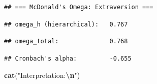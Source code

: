 \documentclass[
]{article}
\newenvironment{Shaded}{\begin{snugshade}}{\end{snugshade}}
\newcommand{\DecValTok}[1]{\textcolor[rgb]{0.00,0.00,0.81}{#1}}
\newcommand{\FunctionTok}[1]{\textcolor[rgb]{0.13,0.29,0.53}{\textbf{#1}}}
\newcommand{\NormalTok}[1]{#1}
\newcommand{\SpecialCharTok}[1]{\textcolor[rgb]{0.81,0.36,0.00}{\textbf{#1}}}
\newcommand{\StringTok}[1]{\textcolor[rgb]{0.31,0.60,0.02}{#1}}
\begin{document}
\begin{verbatim}
## === McDonald's Omega: Extraversion ===
\end{verbatim}

\begin{Shaded}
\end{Shaded}

\begin{verbatim}
## omega_h (hierarchical):   0.767
\end{verbatim}

\begin{Shaded}
\end{Shaded}

\begin{verbatim}
## omega_total:              0.768
\end{verbatim}

\begin{Shaded}
\end{Shaded}

\begin{verbatim}
## Cronbach's alpha:         -0.655
\end{verbatim}

\begin{Shaded}
\begin{Highlighting}[]
\FunctionTok{cat}\NormalTok{(}\StringTok{"Interpretation:}\SpecialCharTok{\textbackslash{}n}\StringTok{"}\NormalTok{)}
\end{Highlighting}
\end{Shaded}
\end{document}
